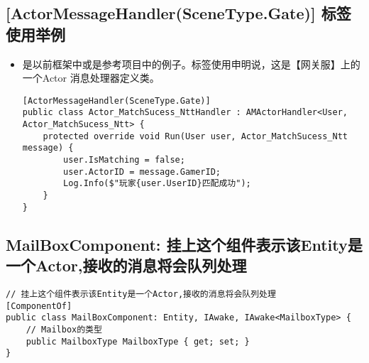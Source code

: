 \documentclass[9pt, b5paper]{article}
\begin{document}
\subsection{[ActorMessageHandler(SceneType.Gate)] 标签使用举例}
\label{sec-7-15}
\begin{itemize}
\item 是以前框架中或是参考项目中的例子。标签使用申明说，这是【网关服】上的一个Actor 消息处理器定义类。
\begin{verbatim}
[ActorMessageHandler(SceneType.Gate)]
public class Actor_MatchSucess_NttHandler : AMActorHandler<User, Actor_MatchSucess_Ntt> {
    protected override void Run(User user, Actor_MatchSucess_Ntt message) {
        user.IsMatching = false;
        user.ActorID = message.GamerID;
        Log.Info($"玩家{user.UserID}匹配成功");
    }
}
\end{verbatim}
\end{itemize}
\subsection{MailBoxComponent: 挂上这个组件表示该Entity是一个Actor,接收的消息将会队列处理}
\label{sec-7-16}
\begin{verbatim}
// 挂上这个组件表示该Entity是一个Actor,接收的消息将会队列处理
[ComponentOf]
public class MailBoxComponent: Entity, IAwake, IAwake<MailboxType> {
    // Mailbox的类型
    public MailboxType MailboxType { get; set; }
}
\end{verbatim}
\end{document}

